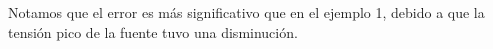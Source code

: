 \documentclass[a4paper]{article} %
\begin{document}
Notamos que el error es más significativo que en el ejemplo 1, debido a que la tensión pico de la fuente tuvo una disminución.

	
	
%	
%	
	
\end{document}

